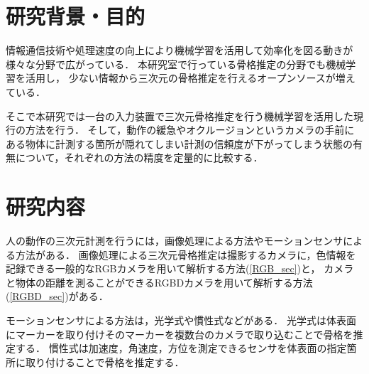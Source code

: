 \documentclass[titlepage]{jarticle}
\begin{document}
\maketitle

\section{研究背景・目的}
情報通信技術や処理速度の向上により機械学習を活用して効率化を図る動きが様々な分野で広がっている．
本研究室で行っている骨格推定の分野でも機械学習を活用し，%
少ない情報から三次元の骨格推定を行えるオープンソースが増えている．



そこで本研究では一台の入力装置で三次元骨格推定を行う機械学習を活用した現行の方法を行う．
そして，動作の緩急やオクルージョンというカメラの手前にある物体に計測する箇所が隠れてしまい計測の信頼度が下がってしまう状態の有無について，それぞれの方法の精度を定量的に比較する．
\section{研究内容}
%
人の動作の三次元計測を行うには，画像処理による方法やモーションセンサによる方法がある．%
画像処理による三次元骨格推定は撮影するカメラに，色情報を記録できる一般的なRGBカメラを用いて解析する方法(\ref{RGB_sec})と，
カメラと物体の距離を測ることができるRGBDカメラを用いて解析する方法(\ref{RGBD_sec})がある．

モーションセンサによる方法は，光学式や慣性式などがある．
光学式は体表面にマーカーを取り付けそのマーカーを複数台のカメラで取り込むことで骨格を推定する．
慣性式は加速度，角速度，方位を測定できるセンサを体表面の指定箇所に取り付けることで骨格を推定する．
\end{document}
